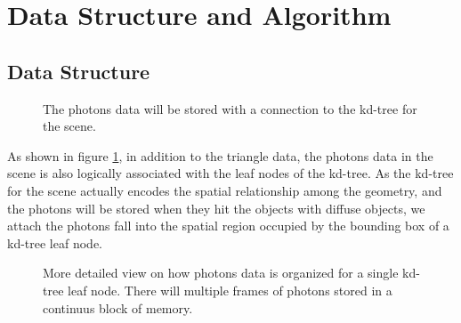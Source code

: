 \section{Data Structure and Algorithm} 

\subsection{Data Structure}

\begin{figure}[htp] 
    \centering 
    \renewcommand{\thefigure}{\thechapter.\arabic{figure}}
    \caption[Association of kd-tree and photons data.]{The photons data will be stored with a connection to the kd-tree for the scene. }
    \label{fig:kd_leaf_photons} 
\end{figure}  

As shown in figure \ref{fig:kd_leaf_photons}, in addition to the triangle data, the photons data in the scene is also logically associated with the leaf nodes of the kd-tree. As the kd-tree for the scene actually encodes the spatial relationship among the geometry, and the photons will be stored when they hit the objects with diffuse objects, we attach the photons fall into the spatial region occupied by the bounding box of a kd-tree leaf node. 

\begin{figure}[htp] 
    \centering 
    \renewcommand{\thefigure}{\thechapter.\arabic{figure}}
    \caption[Detailed view on organization of photons data for a single leaf node.]{More detailed view on how photons data is organized for a single kd-tree leaf node. There will multiple frames of photons stored in a continuus block of memory.}
    \label{fig:kd_leaf_photons_2} 
\end{figure}  

